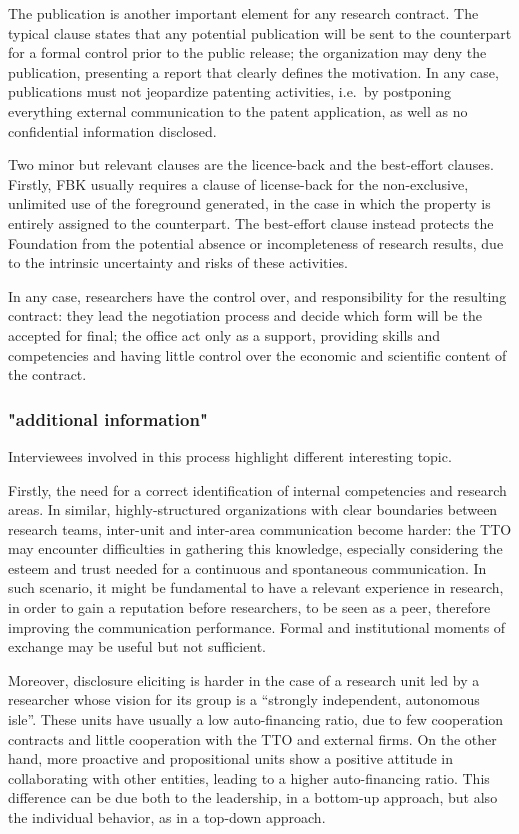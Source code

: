 The publication is another important element for any research contract. The typical clause states that any potential publication will be sent to the counterpart for a formal control prior to the public release; the organization may deny the publication, presenting a report that clearly defines the motivation. In any case, publications must not jeopardize patenting activities, i.e.\ by postponing everything external communication to the patent application, as well as no confidential information disclosed.

Two minor but relevant clauses are the licence-back and the best-effort clauses. Firstly, FBK usually requires a clause of license-back for the non-exclusive, unlimited use of the foreground generated, in the case in which the property is entirely assigned to the counterpart. The best-effort clause instead protects the Foundation from the potential absence or incompleteness of research results, due to the intrinsic uncertainty and risks of these activities.

In any case, researchers have the control over, and responsibility for the resulting contract: they lead the negotiation process and decide which form will be the accepted for final; the office act only as a support, providing skills and competencies and having little control over the economic and scientific content of the contract.

\subsubsection{"additional information"}

Interviewees involved in this process highlight different interesting topic.

Firstly, the need for a correct identification of internal competencies and research areas. In similar, highly-structured organizations with clear boundaries between research teams, inter-unit and inter-area communication become harder: the TTO may encounter difficulties in gathering this knowledge, especially considering the esteem and trust needed for a continuous and spontaneous communication. In such scenario, it might be fundamental to have a relevant experience in research, in order to gain a reputation before researchers, to be seen as a peer, therefore improving the communication performance. Formal and institutional moments of exchange may be useful but not sufficient.

Moreover, disclosure eliciting is harder in the case of a research unit led by a researcher whose vision for its group is a \enquote{strongly independent, autonomous isle}. These units have usually a low auto-financing ratio, due to few cooperation contracts and little cooperation with the TTO and external firms. On the other hand, more proactive and propositional units show a positive attitude in collaborating with other entities, leading to a higher auto-financing ratio. This difference can be due both to the leadership, in a bottom-up approach, but also the individual behavior, as in a top-down approach. 

